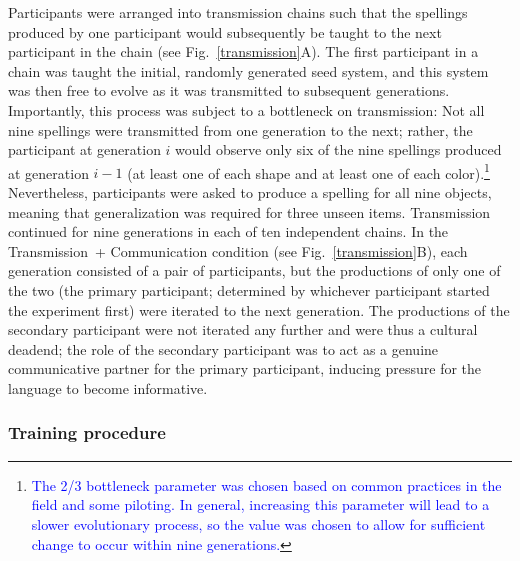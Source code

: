 \documentclass[doc,biblatex]{apa7}
\newcommand\newmaterial[1]{\textcolor{blue}{#1}}
\begin{document}
Participants were arranged into transmission chains such that the spellings produced by one participant would subsequently be taught to the next participant in the chain (see Fig.~\ref{transmission}A). The first participant in a chain was taught the initial, randomly generated seed system, and this system was then free to evolve as it was transmitted to subsequent generations. Importantly, this process was subject to a bottleneck on transmission: Not all nine spellings were transmitted from one generation to the next; rather, the participant at generation $i$ would observe only six of the nine spellings produced at generation $i-1$ (at least one of each shape and at least one of each color).\footnote{\newmaterial{The 2/3 bottleneck parameter was chosen based on common practices in the field and some piloting. In general, increasing this parameter will lead to a slower evolutionary process, so the value was chosen to allow for sufficient change to occur within nine generations.}} Nevertheless, participants were asked to produce a spelling for all nine objects, meaning that generalization was required for three unseen items. Transmission continued for nine generations in each of ten independent chains. In the Transmission~+ Communication condition (see Fig.~\ref{transmission}B), each generation consisted of a pair of participants, but the productions of only one of the two (the primary participant; determined by whichever participant started the experiment first) were iterated to the next generation. The productions of the secondary participant were not iterated any further and were thus a cultural deadend; the role of the secondary participant was to act as a genuine communicative partner for the primary participant, inducing pressure for the language to become informative.

\subsubsection{Training procedure}
\end{document}
